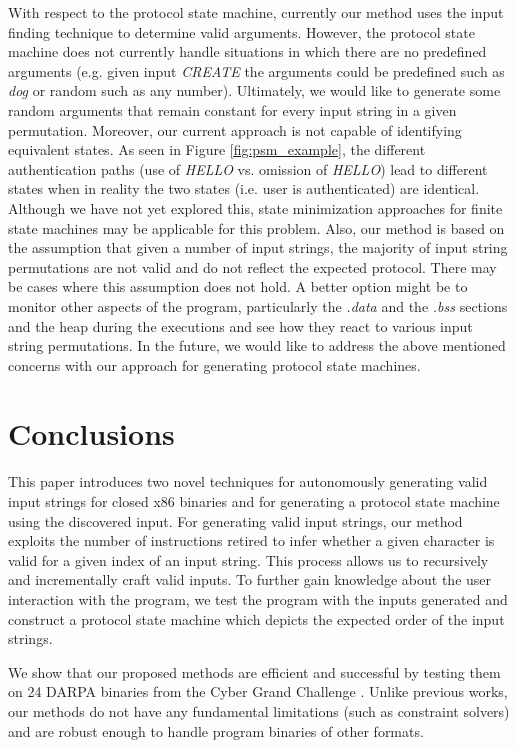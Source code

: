 \documentclass{acm_proc_article-sp}
\def \numbinaries {24}
\begin{document}
With respect to the protocol state machine, currently our method uses the input finding technique to determine valid arguments.
However, the protocol state machine does not currently handle situations in which there are no predefined arguments (e.g. given input \textit{CREATE} the arguments could be predefined such as \textit{dog} or random such as any number).
Ultimately, we would like to generate some random arguments that remain constant for every input string in a given permutation.
Moreover, our current approach is not capable of identifying equivalent states.
As seen in Figure \ref{fig:psm_example}, the different authentication paths (use of \textit{HELLO} vs. omission of \textit{HELLO}) lead to different states when in reality the two states (i.e. user is authenticated) are identical.
Although we have not yet explored this, state minimization approaches for finite state machines may be applicable for this problem.
Also, our method is based on the assumption that given a number of input strings, the majority of input string permutations are not valid and do not reflect the expected protocol.
There may be cases where this assumption does not hold.
A better option might be to monitor other aspects of the program, particularly the \textit{.data} and the \textit{.bss} sections and the heap during the executions and see how they react to various input string permutations.
In the future, we would like to address the above mentioned concerns with our approach for generating protocol state machines.

\section{Conclusions}
This paper introduces two novel techniques for autonomously generating valid input strings for closed x86 binaries and for generating a protocol state machine using the discovered input.
For generating valid input strings, our method exploits the number of instructions retired to infer whether a given character is valid for a given index of an input string.
This process allows us to recursively and incrementally craft valid inputs.
To further gain knowledge about the user interaction with the program, we test the program with the inputs generated and construct a protocol state machine which depicts the expected order of the input strings.

We show that our proposed methods are efficient and successful by testing them on \numbinaries{} DARPA binaries from the Cyber Grand Challenge \cite{darpacgc}. 
Unlike previous works, our methods do not have any fundamental limitations (such as constraint solvers) and are robust enough to handle program binaries of other formats.
\end{document}
